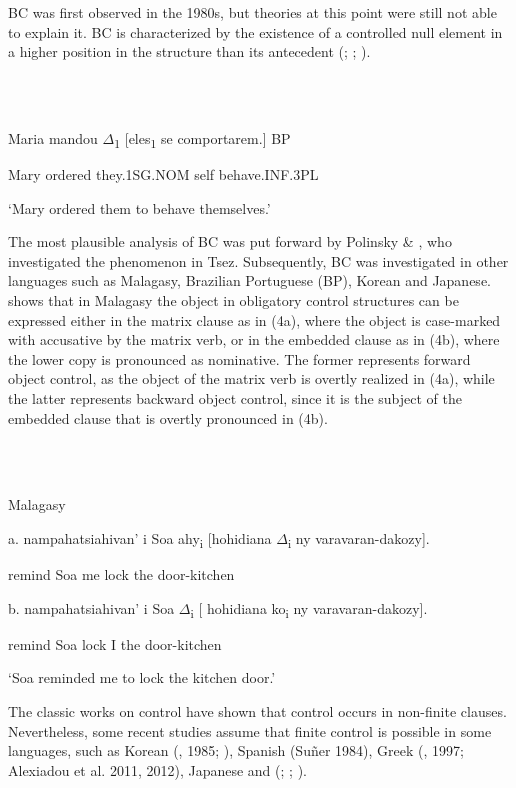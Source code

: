 \documentclass[output=paper]{langsci/langscibook}
\begin{document}
  BC was first observed in the 1980s, but theories at this point were still not able to explain it. BC is characterized by the existence of a controlled null element in a higher position in the structure than its antecedent (\citealt{Farell1995}; \citealt{Rodrigues2004}; \citealt{Boeckx2006}). 

\ea%
    \label{ex:key:3}
    \gll\\
        \\
    \glt
    \z

           Maria mandou ${\Delta}$\textsubscript{1} [eles\textsubscript{1} se comportarem.]  BP

  Mary ordered they.1SG.NOM self behave.INF.3PL

  ‘Mary ordered them to behave themselves.’

The most plausible analysis of BC was put forward by Polinsky \& \citet{Potsdam2002}, who investigated the phenomenon in Tsez. Subsequently, BC was investigated in other languages such as Malagasy, Brazilian Portuguese (BP), Korean and Japanese. \citet{Potsdam2009} shows that in Malagasy the object in obligatory control structures can be expressed either in the matrix clause as in (4a), where the object is case-marked with accusative by the matrix verb, or in the embedded clause as in (4b), where the lower copy is pronounced as nominative. The former represents forward object control, as the object of the matrix verb is overtly realized in (4a), while the latter represents backward object control, since it is the subject of the embedded clause that is overtly pronounced in (4b). 

\ea%
    \label{ex:key:4}
    \gll\\
        \\
    \glt
    \z

          Malagasy \citep[755]{Potsdam2009}

a.  nampahatsiahivan’ i Soa  ahy\textsubscript{i} [hohidiana ${\Delta}$\textsubscript{i}   ny varavaran-dakozy].

    remind            Soa   me    lock               the door-kitchen

  b.  nampahatsiahivan’ i Soa  ${\Delta}$\textsubscript{i}        [  hohidiana ko\textsubscript{i}   ny varavaran-dakozy].

    remind                    Soa     lock          I      the door-kitchen

    ‘Soa reminded me to lock the kitchen door.’

The classic works on control have shown that control occurs in non-finite clauses. Nevertheless, some recent studies assume that finite control is possible in some languages, such as Korean (\citealt{Yang1982}, 1985; \citealt{Borer1989}), Spanish (Suñer 1984), Greek (\citealt{Terzi1992}, 1997; Alexiadou et al. 2011, 2012), Japanese \citep{Uchibori2000} and (\citealt{Farrell1995}; \citealt{Rodrigues2004}; \citealt{Boeckx2006}).
\end{document}
